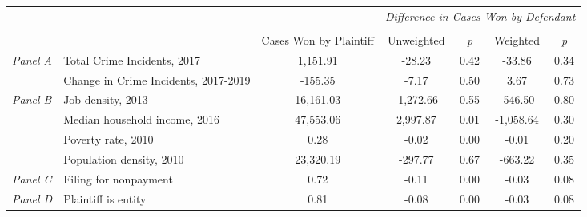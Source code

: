 \begin{tabular}{llccccc}
\toprule
 &  & \textit{} & \multicolumn{4}{c}{\textit{Difference in Cases Won by Defendant}} \\
\cline{4-7}
\\
 &  & Cases Won by Plaintiff & Unweighted & \emph{p} & Weighted & \emph{p} \\
\midrule
\multirow[c]{2}{.75cm}{\textit{Panel A}} & Total Crime Incidents, 2017 & 1,151.91 & -28.23 & 0.42 & -33.86 & 0.34 \\
 & Change in Crime Incidents, 2017-2019 & -155.35 & -7.17 & 0.50 & 3.67 & 0.73 \\
\cline{1-7}
\multirow[c]{4}{.75cm}{\textit{Panel B}} & Job density, 2013 & 16,161.03 & -1,272.66 & 0.55 & -546.50 & 0.80 \\
 & Median household income, 2016 & 47,553.06 & 2,997.87 & 0.01 & -1,058.64 & 0.30 \\
 & Poverty rate, 2010 & 0.28 & -0.02 & 0.00 & -0.01 & 0.20 \\
 & Population density, 2010 & 23,320.19 & -297.77 & 0.67 & -663.22 & 0.35 \\
\cline{1-7}
\textit{Panel C} & Filing for nonpayment & 0.72 & -0.11 & 0.00 & -0.03 & 0.08 \\
\cline{1-7}
\textit{Panel D} & Plaintiff is entity & 0.81 & -0.08 & 0.00 & -0.03 & 0.08 \\
\cline{1-7}
\bottomrule
\end{tabular}
